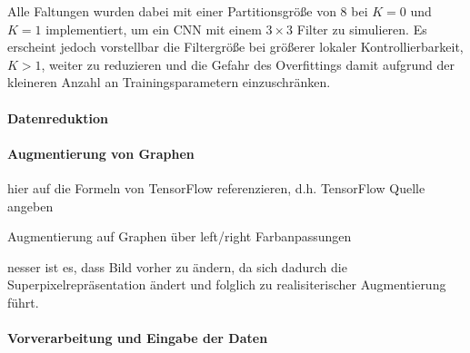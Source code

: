 Alle Faltungen wurden dabei mit einer Partitionsgröße von $8$ bei $K=0$ und $K=1$ implementiert, um ein \gls{CNN} mit einem $3 \times 3$ Filter zu simulieren.
Es erscheint jedoch vorstellbar die Filtergröße bei größerer lokaler Kontrollierbarkeit, \dhe{} $K > 1$, weiter zu reduzieren und die Gefahr des Overfittings damit aufgrund der kleineren Anzahl an Trainingsparametern einzuschränken.

\paragraph{Datenreduktion}
\label{datenreduktion}

\paragraph{Augmentierung von Graphen}
\label{augmentierung_von_graphen}

hier auf die Formeln von TensorFlow referenzieren, d.h. TensorFlow Quelle angeben
\cite{tensorflow}

Augmentierung auf Graphen über left/right
Farbanpassungen


nesser ist es, dass Bild vorher zu ändern, da sich dadurch die Superpixelrepräsentation ändert
und folglich zu realisiterischer Augmentierung führt.

\paragraph{Vorverarbeitung und Eingabe der Daten}
\label{vorverarbeitung}
